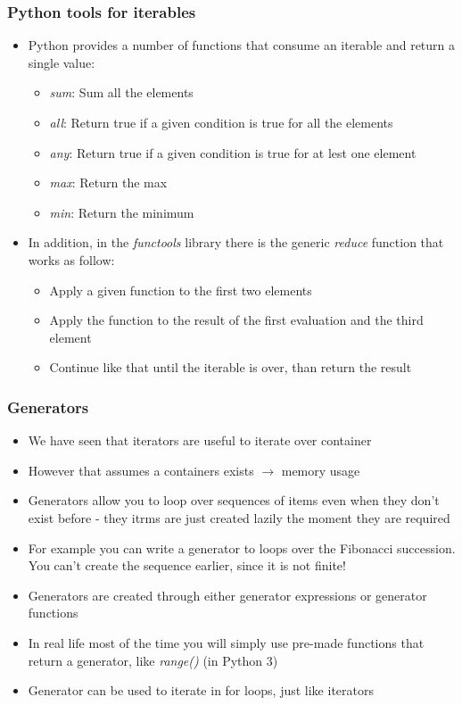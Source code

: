 \documentclass[9pt]{beamer}
\begin{document}
\begin{frame}
  \frametitle{Python tools for iterables}
  \begin{itemize}
    \item Python provides a number of functions that consume an iterable and return a single value:
    \begin{itemize}
      \item \emph{sum}: Sum all the elements
      \item \emph{all}: Return true if a given condition is true for all the elements
      \item \emph{any}: Return true if a given condition is true for at lest one element
      \item \emph{max}: Return the max
      \item \emph{min}: Return the minimum
    \end{itemize}
    \medskip
    \item In addition, in the \alert{\emph{functools}} library there is the generic
          \emph{reduce} function that works as follow:
    \begin{itemize}
      \item Apply a given function to the first two elements
      \item Apply the function to the result of the first evaluation and the third element
      \item Continue like that until the iterable is over, than return the result
    \end{itemize}
  \end{itemize}
\end{frame}


\begin{frame}
  \frametitle{Generators}
  
  \begin{itemize}
    \item We have seen that iterators are useful to iterate over container
    \item However that assumes a containers exists $\rightarrow$ memory usage
    \item \alert{Generators} allow you to loop over sequences of items even when
          they don't exist before - they itrms are just created \alert{lazily} the
          moment they are required
    \item For example you can write a generator to loops over the Fibonacci
          succession. You can't create the sequence earlier, since it is not
          finite!
    \item Generators are created through either \alert{generator expressions} or
          \alert{generator functions}
    \item In real life most of the time you will simply use pre-made functions
          that return a generator, like \emph{range()} (in Python 3)
    \item Generator can be used to iterate in for loops, just like iterators
  \end{itemize}
  
\end{frame}
\end{document}
